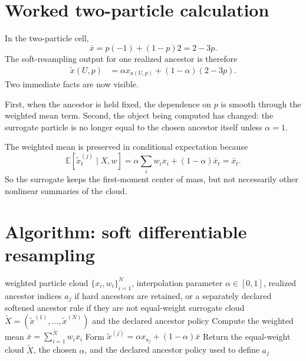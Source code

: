 \section{Worked two-particle calculation}
\label{sec:bf-soft-worked-cell}

In the two-particle cell,
\[
  \bar x = p(-1)+(1-p)2 = 2-3p.
\]
The soft-resampling output for one realized ancestor is therefore
\begin{align}
\label{eq:bf-soft-two-particle-output}
  \tilde x(U,p)
  &=
  \alpha x_{a(U,p)} + (1-\alpha)(2-3p).
\end{align}
Two immediate facts are now visible.

First, when the ancestor is held fixed, the dependence on \(p\) is smooth through
the weighted mean term.  Second, the object being computed has changed: the
surrogate particle is no longer equal to the chosen ancestor itself unless
\(\alpha=1\).

The weighted mean is preserved in conditional expectation because
\begin{equation}
\label{eq:bf-soft-mean-preservation}
  \mathbb E[\tilde x_t^{(j)}\mid X,w]
  =
  \alpha\sum_i w_i x_i + (1-\alpha)\bar x_t
  =
  \bar x_t.
\end{equation}
So the surrogate keeps the first-moment center of mass, but not necessarily other
nonlinear summaries of the cloud.

\section{Algorithm: soft differentiable resampling}
\label{sec:bf-soft-algorithm}

\begin{algorithm}[ht]
\caption{\texttt{soft\_resampling\_step}}
\begin{algorithmic}[1]
\Require weighted particle cloud \(\{x_i,w_i\}_{i=1}^N\), interpolation parameter \(\alpha\in[0,1]\), realized ancestor indices \(a_j\) if hard ancestors are retained, or a separately declared softened ancestor rule if they are not
\Ensure equal-weight surrogate cloud \(\widetilde X=(\tilde x^{(1)},\ldots,\tilde x^{(N)})\) and the declared ancestor policy
\State Compute the weighted mean \(\bar x = \sum_{i=1}^N w_i x_i\)
  \State Form \(\tilde x^{(j)} = \alpha x_{a_j} + (1-\alpha)\bar x\)
\EndFor
\State Return the equal-weight cloud \(\widetilde X\), the chosen \(\alpha\), and the declared ancestor policy used to define \(a_j\)
\end{algorithmic}
\end{algorithm}

